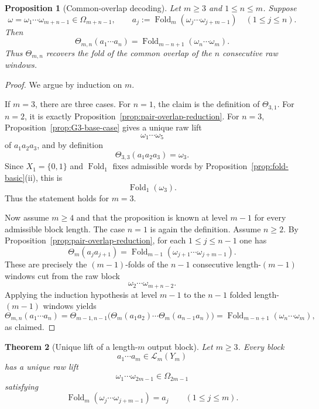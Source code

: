 \documentclass[11pt,letterpaper]{article}
\numberwithin{equation}{section}
\theoremstyle{plain}
\newtheorem{theorem}{Theorem}[section]
\newtheorem{proposition}[theorem]{Proposition}
\theoremstyle{definition}
\theoremstyle{remark}
\DeclareMathOperator{\Fold}{Fold}
\begin{document}
\begin{proposition}[Common-overlap decoding]
\label{prop:common-overlap-decoder}
Let $m\ge 3$ and $1\le n\le m$.  Suppose
\[
\omega=\omega_1\cdots\omega_{m+n-1}\in\Omega_{m+n-1},
\qquad
a_j:=\Fold_m(\omega_j\cdots\omega_{j+m-1})
\quad (1\le j\le n).
\]
Then
\[
\Theta_{m,n}(a_1\cdots a_n)
=
\Fold_{m-n+1}(\omega_n\cdots\omega_m).
\]
Thus $\Theta_{m,n}$ recovers the fold of the common overlap of the $n$
consecutive raw windows.
\end{proposition}

\begin{proof}
We argue by induction on $m$.

If $m=3$, there are three cases.  For $n=1$, the claim is the definition of
$\Theta_{3,1}$.  For $n=2$, it is exactly
Proposition~\ref{prop:pair-overlap-reduction}.  For $n=3$,
Proposition~\ref{prop:G3-base-case} gives a unique raw lift
\[
\omega_1\cdots\omega_5
\]
of $a_1a_2a_3$, and by definition
\[
\Theta_{3,3}(a_1a_2a_3)=\omega_3.
\]
Since $X_1=\{0,1\}$ and $\Fold_1$ fixes admissible words by
Proposition~\ref{prop:fold-basic}\textup{(ii)}, this is
\[
\Fold_1(\omega_3).
\]
Thus the statement holds for $m=3$.

Now assume $m\ge 4$ and that the proposition is known at level $m-1$ for every
admissible block length.  The case $n=1$ is again the definition.  Assume
$n\ge 2$.  By Proposition~\ref{prop:pair-overlap-reduction}, for each
$1\le j\le n-1$ one has
\[
\Theta_m(a_ja_{j+1})
=
\Fold_{m-1}(\omega_{j+1}\cdots\omega_{j+m-1}).
\]
These are precisely the $(m-1)$-folds of the $n-1$ consecutive length-$(m-1)$
windows cut from the raw block
\[
\omega_2\cdots\omega_{m+n-2}.
\]
Applying the induction hypothesis at level $m-1$ to the $n-1$ folded
length-$(m-1)$ windows yields
\[
\Theta_{m,n}(a_1\cdots a_n)
=
\Theta_{m-1,n-1}\bigl(
\Theta_m(a_1a_2)\cdots\Theta_m(a_{n-1}a_n)
\bigr)
=
\Fold_{m-n+1}(\omega_n\cdots\omega_m),
\]
as claimed.
\end{proof}

\begin{theorem}[Unique lift of a length-$m$ output block]
\label{thm:length-m-block-unique-lift}
Let $m\ge 3$.  Every block
\[
a_1\cdots a_m\in\mathcal L_m(Y_m)
\]
has a unique raw lift
\[
\omega_1\cdots\omega_{2m-1}\in\Omega_{2m-1}
\]
satisfying
\[
\Fold_m(\omega_j\cdots\omega_{j+m-1})=a_j
\qquad (1\le j\le m).
\]
\end{theorem}
\end{document}
